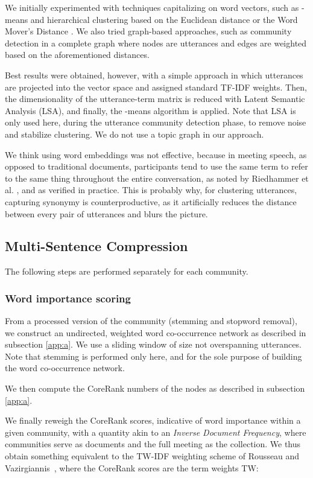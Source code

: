 \documentclass[11pt,a4paper]{article}
\begin{document}
We initially experimented with techniques capitalizing on word vectors, such as -means and hierarchical clustering based on the Euclidean distance or the Word Mover's Distance \cite{kusner2015word}. We also tried graph-based approaches, such as community detection in a complete graph where nodes are utterances and edges are weighted based on the aforementioned distances.

Best results were obtained, however, with a simple approach in which utterances are projected into the vector space and assigned standard TF-IDF weights. Then, the dimensionality of the utterance-term matrix is reduced with Latent Semantic Analysis (LSA), and finally, the -means algorithm is applied. Note that LSA is only used here, during the utterance community detection phase, to remove noise and stabilize clustering. We do not use a topic graph in our approach.

We think using word embeddings was not effective, because in meeting speech, as opposed to traditional documents, participants tend to use the same term to refer to the same thing throughout the entire conversation, as noted by Riedhammer et al. , and as verified in practice. This is probably why, for clustering utterances, capturing synonymy is counterproductive, as it artificially reduces the distance between every pair of utterances and blurs the picture.
\subsection{Multi-Sentence Compression} \label{subsec:msc}
The following steps are performed separately for each community.

\subsubsection*{Word importance scoring}\label{subsub:deg}
From a processed version of the community (stemming and stopword removal), we construct an undirected, weighted word co-occurrence network as described in subsection \ref{app:a}. We use a sliding window of size  not overspanning utterances. Note that stemming is performed only here, and for the sole purpose of building the word co-occurrence network.

We then compute the CoreRank numbers of the nodes as described in subsection \ref{app:a}.

We finally reweigh the CoreRank scores, indicative of word importance within a given community, with a quantity akin to an \textit{Inverse Document Frequency}, where communities serve as documents and the full meeting as the collection. We thus obtain something equivalent to the TW-IDF weighting scheme of Rousseau and Vazirgiannis~, where the CoreRank scores are the term weights TW:
\end{document}
